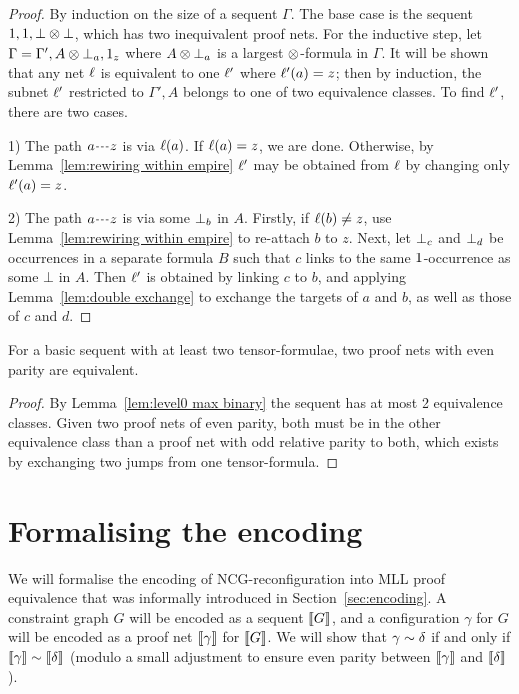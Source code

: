 \documentclass{lmcs}
\let\capsabbrev=\uppercase
\begin{document}
\begin{proof}
By induction on the size of a sequent $\Gamma$. The base case is the sequent $1,1,\bot\otimes\bot$, which has two inequivalent proof nets. For the inductive step, let $\Gamma=\Gamma',A\otimes\bot_{a},1_{z}$ where $A\otimes\bot_{a}$ is a largest $\otimes$-formula in $\Gamma$. It will be shown that any net $\ell$ is equivalent to one $\ell'$ where $\ell'(a)=z$; then by induction, the subnet $\ell'$ restricted to $\Gamma',A$ belongs to one of two equivalence classes. To find $\ell'$, there are two cases.

1) The path $\path az$ is via $\ell(a)$. If $\ell(a)=z$, we are done. Otherwise, by Lemma~\ref{lem:rewiring within empire} $\ell'$ may be obtained from $\ell$ by changing only $\ell'(a)=z$.

2) The path $\path az$ is via some $\bot_{b}$ in $A$. Firstly, if $\ell(b)\neq z$, use Lemma~\ref{lem:rewiring within empire} to re-attach $b$ to $z$. Next, let $\bot_{c}$ and $\bot_{d}$ be occurrences in a separate formula $B$ such that $c$ links to the same $1$-occurrence as some $\bot$ in $A$. Then $\ell'$ is obtained by linking $c$ to $b$, and applying Lemma~\ref{lem:double exchange} to exchange the targets of $a$ and $b$, as well as those of $c$ and $d$.
\end{proof}


\begin{proposition}
\label{prop:parity determines equivalence}
For a basic sequent with at least two tensor-formulae, two proof nets with even parity are equivalent.
\end{proposition}

\begin{proof}
By Lemma~\ref{lem:level0 max binary} the sequent has at most 2 equivalence classes. Given two proof nets of even parity, both must be in the other equivalence class than a proof net with odd relative parity to both, which exists by exchanging two jumps from one tensor-formula.
\end{proof}




\section{Formalising the encoding}
\label{sec:correctness}


We will formalise the encoding of \capsabbrev{ncg}-reconfiguration into \capsabbrev{mll} proof equivalence that was informally introduced in Section~\ref{sec:encoding}. A constraint graph $G$ will be encoded as a sequent $\llbracket G\rrbracket$, and a configuration $\gamma$ for $G$ will be encoded as a proof net $\llbracket\gamma\rrbracket$ for $\llbracket G\rrbracket$. We will show that $\gamma\perm\delta$ if and only if $\itn\gamma\perm\itn\delta$ (modulo a small adjustment to ensure even parity between $\llbracket\gamma\rrbracket$ and $\llbracket\delta\rrbracket$).
\end{document}
